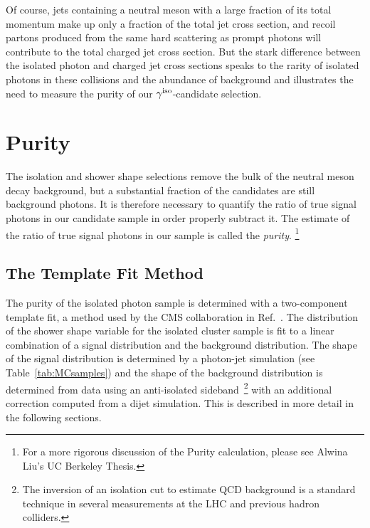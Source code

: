 \begin{figure}
\end{figure}

 

Of course, jets containing a neutral meson with a large fraction of its total momentum make up only a fraction of the total jet cross section, and recoil partons produced from the same hard scattering as prompt photons will contribute to the total charged jet cross section. But the stark difference between the isolated photon and charged jet cross sections speaks to the rarity of isolated photons in these collisions and the abundance of background and illustrates the need to measure the purity of our $\gamma^\mathrm{iso}$-candidate selection.%





\section{Purity}
\label{sec:purity}
The isolation and shower shape selections remove the bulk of the neutral meson decay background, but a substantial fraction of the \gammaiso candidates are still background photons. It is therefore necessary to quantify the ratio of true signal photons in our candidate sample in order properly subtract it. The estimate of the ratio of true signal photons in our \gammaiso sample is called the \textit{purity}. \footnote{For a more rigorous discussion of the Purity calculation, please see Alwina Liu's UC Berkeley Thesis.}

\subsection{The Template Fit Method}
The purity of the isolated photon sample is determined with a two-component template fit, a method used by the CMS collaboration in Ref.~\cite{Sirunyan:2017qhf}. The distribution of the shower shape variable for the isolated cluster sample is fit to a linear combination of a signal distribution and the background distribution. The shape of the signal distribution is determined by a photon-jet simulation (see Table~\ref{tab:MCsamples}) and the shape of the background distribution is determined from data using an anti-isolated sideband~\footnote{The inversion of an isolation cut to estimate QCD background is a standard technique in several measurements at the LHC and previous hadron colliders.} with an additional correction computed from a dijet simulation. This is described in more detail in the following sections.  

